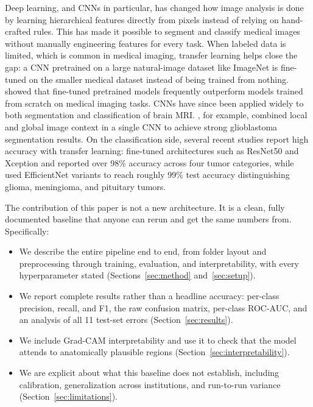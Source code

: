 \documentclass[twocolumn]{article}
\begin{document}
Deep learning, and CNNs in particular, has changed how image analysis is done by learning hierarchical features directly from pixels instead of relying on hand-crafted rules. This has made it possible to segment and classify medical images without manually engineering features for every task. When labeled data is limited, which is common in medical imaging, transfer learning helps close the gap: a CNN pretrained on a large natural-image dataset like ImageNet is fine-tuned on the smaller medical dataset instead of being trained from nothing. \citet{tajbakhsh2016convolutional} showed that fine-tuned pretrained models frequently outperform models trained from scratch on medical imaging tasks. CNNs have since been applied widely to both segmentation and classification of brain MRI. \citet{havaei2017brain}, for example, combined local and global image context in a single CNN to achieve strong glioblastoma segmentation results. On the classification side, several recent studies report high accuracy with transfer learning: \citet{disci2023fine} fine-tuned architectures such as ResNet50 and Xception and reported over 98\% accuracy across four tumor categories, while \citet{vimala2023efficientnet} used EfficientNet variants to reach roughly 99\% test accuracy distinguishing glioma, meningioma, and pituitary tumors.

The contribution of this paper is not a new architecture. It is a clean, fully documented baseline that anyone can rerun and get the same numbers from. Specifically:

\begin{itemize}
\itemsep0.2em
\item We describe the entire pipeline end to end, from folder layout and preprocessing through training, evaluation, and interpretability, with every hyperparameter stated (Sections~\ref{sec:method} and~\ref{sec:setup}).
\item We report complete results rather than a headline accuracy: per-class precision, recall, and F1, the raw confusion matrix, per-class ROC-AUC, and an analysis of all 11 test-set errors (Section~\ref{sec:results}).
\item We include Grad-CAM interpretability and use it to check that the model attends to anatomically plausible regions (Section~\ref{sec:interpretability}).
\item We are explicit about what this baseline does not establish, including calibration, generalization across institutions, and run-to-run variance (Section~\ref{sec:limitations}).
\end{itemize}
\end{document}
